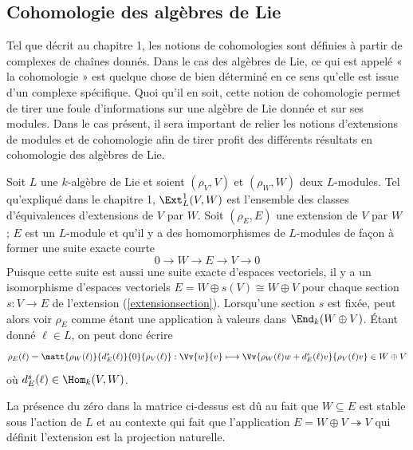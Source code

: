 %
\subsection{Cohomologie des algèbres de Lie}

Tel que décrit au chapitre 1, les notions de cohomologies sont définies à partir de complexes de chaînes donnés. Dans le cas des algèbres de Lie, ce qui est appelé  « la cohomologie » est quelque chose de bien déterminé en ce sens qu'elle est issue d'un complexe spécifique. Quoi qu'il en soit, cette notion de cohomologie permet de tirer une foule d'informations sur une algèbre de Lie donnée et sur ses modules. Dans le cas présent, il sera important de relier les notions d'extensions de modules et de cohomologie afin de tirer profit des différents résultats en cohomologie des algèbres de Lie. 

Soit $L$ une $k$-algèbre de Lie et soient $(\rho_V,V)$ et $(\rho_W,W)$ deux $L$-modules. Tel qu'expliqué dans le chapitre 1, $\Ext_L^1(V,W)$ est l'ensemble des classes d'équivalences d'extensions de $V$ par $W$. Soit $(\rho_E,E)$ une extension de $V$ par $W$ ; $E$ est un $L$-module et qu'il y a des homomorphismes de $L$-modules de façon à former une suite exacte courte
\begin{equation} \label{extensionsection}
0 \longrightarrow W \longrightarrow E \longrightarrow V \longrightarrow 0
\end{equation}
Puisque cette suite est aussi une suite exacte d'espaces vectoriels, il y a un isomorphisme d'espaces vectoriels $E = W \oplus s(V) \cong W \oplus V$ pour chaque section $s : V \rightarrow E$ de l'extension (\ref{extensionsection}). Lorsqu'une section $s$ est fixée, peut alors voir $\rho_E$ comme étant une application à valeurs dans $\End_k(W \oplus V)$. Étant donné $\ell \in L$, on peut donc écrire
\begin{equation} \label{matriceextension}
\rho_E(\ell) = \matt{\rho_W(\ell)}{d_E^s(\ell)}{0}{\rho_V(\ell)} : \Vv{w}{v} \longmapsto \Vv{\rho_W(\ell)w + d_E^s(\ell)v}{\rho_V(\ell)v} \in W \oplus V
\end{equation}
où $d_E^s(\ell) \in \Hom_k(V,W)$. 

\begin{Rem} La présence du zéro dans la matrice ci-dessus est dû au fait que $W \subseteq E$ est stable sous l'action de $L$ et au contexte qui fait que l'application $E = W \oplus V \twoheadrightarrow V$  qui définit l'extension est la projection naturelle.
\end{Rem}

